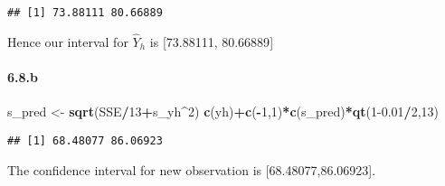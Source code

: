 \documentclass[]{article}
\newenvironment{Shaded}{\begin{snugshade}}{\end{snugshade}}
\newcommand{\DataTypeTok}[1]{\textcolor[rgb]{0.13,0.29,0.53}{#1}}
\newcommand{\DecValTok}[1]{\textcolor[rgb]{0.00,0.00,0.81}{#1}}
\newcommand{\FloatTok}[1]{\textcolor[rgb]{0.00,0.00,0.81}{#1}}
\newcommand{\KeywordTok}[1]{\textcolor[rgb]{0.13,0.29,0.53}{\textbf{#1}}}
\newcommand{\NormalTok}[1]{#1}
\newcommand{\OperatorTok}[1]{\textcolor[rgb]{0.81,0.36,0.00}{\textbf{#1}}}
\newcommand{\OtherTok}[1]{\textcolor[rgb]{0.56,0.35,0.01}{#1}}
\newcommand{\StringTok}[1]{\textcolor[rgb]{0.31,0.60,0.02}{#1}}
\let\oldparagraph\paragraph
\renewcommand{\paragraph}[1]{\oldparagraph{#1}\mbox{}}
\begin{document}
\begin{Shaded}
\end{Shaded}

\begin{verbatim}
## [1] 73.88111 80.66889
\end{verbatim}

Hence our interval for \(\hat Y_h\) is {[}73.88111, 80.66889{]}

\hypertarget{b-3}{%
\paragraph{6.8.b}\label{b-3}}

\begin{Shaded}
\begin{Highlighting}[]
\NormalTok{s_pred <-}\StringTok{ }\KeywordTok{sqrt}\NormalTok{(SSE}\OperatorTok{/}\DecValTok{13}\OperatorTok{+}\NormalTok{s_yh}\OperatorTok{^}\DecValTok{2}\NormalTok{)}
\KeywordTok{c}\NormalTok{(yh)}\OperatorTok{+}\KeywordTok{c}\NormalTok{(}\OperatorTok{-}\DecValTok{1}\NormalTok{,}\DecValTok{1}\NormalTok{)}\OperatorTok{*}\KeywordTok{c}\NormalTok{(s_pred)}\OperatorTok{*}\KeywordTok{qt}\NormalTok{(}\DecValTok{1}\FloatTok{-0.01}\OperatorTok{/}\DecValTok{2}\NormalTok{,}\DecValTok{13}\NormalTok{)}
\end{Highlighting}
\end{Shaded}

\begin{verbatim}
## [1] 68.48077 86.06923
\end{verbatim}

The confidence interval for new observation is {[}68.48077,86.06923{]}.
\end{document}
